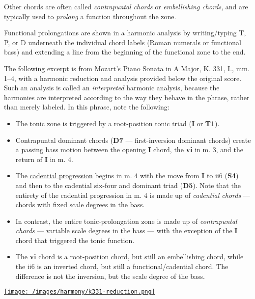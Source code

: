 \documentclass{book}
\providecommand{\tightlist}{%
  \setlength{\itemsep}{0pt}\setlength{\parskip}{0pt}}
\begin{document}
Other chords are often called \emph{contrapuntal chords} or \emph{embellishing
chords}, and are typically used to \emph{prolong} a function throughout the
zone.

Functional prolongations are shown in a harmonic analysis by writing/typing T,
P, or D underneath the individual chord labels (Roman numerals or functional
bass) and extending a line from the beginning of the functional zone to the
end.

The following excerpt is from Mozart's Piano Sonata in A Major, K. 331, I.,
mm. 1--4, with a harmonic reduction and analysis provided below the original
score. Such an analysis is called an \emph{interpreted} harmonic analysis,
because the harmonies are interpreted according to the way they behave in the
phrase, rather than merely labeled. In this phrase, note the following:

\begin{itemize}
\tightlist
\item
  The tonic zone is triggered by a root-position tonic triad (\textbf{I} or
  \textbf{T1}).\\
\item
  Contrapuntal dominant chords (\textbf{D7} --- first-inversion dominant
  chords) create a passing bass motion between the opening \textbf{I} chord,
  the \textbf{vi} in m. 3, and the return of \textbf{I} in m. 4.
\item
  The \href{harmonicAnalysis}{cadential progression} begins in m. 4 with the
  move from \textbf{I} to ii6 (\textbf{S4}) and then to the cadential six-four
  and dominant triad (\textbf{D5}). Note that the entirety of the cadential
  progression in m. 4 is made up of \emph{cadential chords} --- chords with
  fixed scale degrees in the bass.\\
\item
  In contrast, the entire tonic-prolongation zone is made up of
  \emph{contrapuntal chords} --- variable scale degrees in the bass --- with
  the exception of the \textbf{I} chord that triggered the tonic function.\\
\item
  The \textbf{vi} chord is a root-position chord, but still an embellishing
  chord, while the ii6 is an inverted chord, but still a functional/cadential
  chord. The difference is not the inversion, but the scale degree of the
  bass.
\end{itemize}

\href{/images/harmony/k331-reduction.png}{\texttt{[image: /images/harmony/k331-reduction.png]}}
\end{document}
